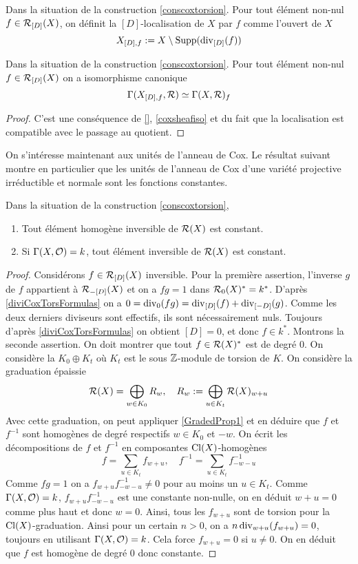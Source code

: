 \begin{defn}
Dans la situation de la construction \ref{conscoxtorsion}. Pour tout élément non-nul $f\in\mathcal{R}_{[D]}(X)$, on définit la $[D]$-localisation de $X$ par $f$ comme l'ouvert de $X$
$$X_{[D],f}:=X\setminus\operatorname{Supp}(\operatorname{div}_{[D]}(f))$$
\end{defn}

\begin{prop}
Dans la situation de la construction \ref{conscoxtorsion}. Pour tout élément non-nul $f\in\mathcal{R}_{[D]}(X)$ on a isomorphisme canonique
$$\Gamma(X_{[D],f},\mathcal{R})\simeq \Gamma(X,\mathcal{R})_f$$
\end{prop}
\begin{proof}
C'est une conséquence de \ref{}, \ref{coxsheafiso} et du fait que la localisation est compatible avec le passage au quotient.
\end{proof}

On s'intéresse maintenant aux unités de l'anneau de Cox. Le résultat suivant montre en particulier que les unités de l'anneau de Cox d'une variété projective irréductible et normale sont les fonctions constantes.

\begin{prop}
Dans la situation de la construction \ref{conscoxtorsion},
\begin{enumerate}
\item Tout élément homogène inversible de $\mathcal{R}(X)$ est constant.
\item Si $\Gamma(X, \mathcal{O})=k$, tout élément inversible de $\mathcal{R}(X)$ est constant.
\end{enumerate}
\end{prop}
\begin{proof}
Considérons $f\in\mathcal{R}_{[D]}(X)$ inversible. Pour la première assertion, l'inverse $g$ de $f$ appartient à $\mathcal{R}_{-[D]}(X)$ et on a $fg=1$ dans $\mathcal{R}_0(X)^*=k^*$. D'après \ref{diviCoxTorsFormulas} on a $0=\operatorname{div}_0(fg)=\operatorname{div}_{[D]}(f)+\operatorname{div}_{[-D]}(g)$. Comme les deux derniers diviseurs sont effectifs, ils sont nécessairement nuls. Toujours d'après \ref{diviCoxTorsFormulas} on obtient $[D]=0$, et donc $f\in k^*$.
Montrons la seconde assertion. On doit montrer que tout $f\in\mathcal{R}(X)^*$ est de degré $0$. On considère la $K_0\oplus K_t$ où $K_t$ est le sous $\mathbb{Z}$-module de torsion de $K$.
On considère la graduation épaissie 
$$\mathcal{R}(X)=\bigoplus_{w\in K_0}R_w,\,\,\,\,\,\, R_w:=\bigoplus_{u\in K_t}\mathcal{R}(X)_{w+u}$$
Avec cette graduation, on peut appliquer \ref{GradedProp1} et en déduire que $f$ et $f^{-1}$ sont homogènes de degré respectifs $w\in K_0$ et $-w$. On écrit les décompositions de $f$ et $f^{-1}$ en composantes $\operatorname{Cl}(X)$-homogènes
$$f=\sum_{u\in K_t}f_{w+u},\,\,\,\,\,\, f^{-1}=\sum_{u\in K_t}f^{-1}_{-w-u}$$
Comme $fg=1$ on a $f_{w+u}f^{-1}_{-w-u}\neq 0$ pour au moins un $u\in K_t$. Comme $\Gamma(X, \mathcal{O})=k$, $f_{w+u}f^{-1}_{-w-u}$ est une constante non-nulle, on en déduit $w+u=0$ comme plus haut et donc $w=0$. Ainsi, tous les $f_{w+u}$ sont de torsion pour la $\operatorname{Cl}(X)$-graduation. Ainsi pour un certain $n>0$, on a $n\operatorname{div}_{w+u}(f_{w+u})=0$, toujours en utilisant $\Gamma(X, \mathcal{O})=k$. Cela force $f_{w+u}=0$ si $u\neq 0$. On en déduit que $f$ est homogène de degré $0$ donc constante.
\end{proof}

